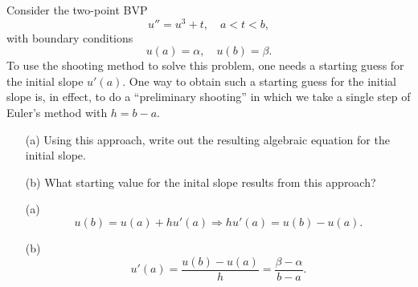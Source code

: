 \begin{pro}
  Consider the two-point BVP
  \begin{displaymath}
    u'' = u^3 + t, \quad a < t < b,
  \end{displaymath}
  with boundary conditions
  \begin{displaymath}
    u(a) = \alpha, \quad u(b) = \beta.
  \end{displaymath}
  To use the shooting method to solve this problem,
  one needs a starting guess for the initial slope $u'(a)$.
  One way to obtain such a starting guess for the initial slope is,
  in effect,
  to do a ``preliminary shooting'' in which we take a single step
  of Euler's method with $h=b-a$.
  \begin{itemize}
  \item[(a)]
    Using this approach,
    write out the resulting algebraic equation for the initial slope.

  \item[(b)]
    What starting value for the inital slope results from this approach?
  \end{itemize}
\end{pro}

\begin{sol}
  \begin{itemize}
  \item[(a)]
    \begin{displaymath}
      u(b) = u(a) + hu'(a) \Rightarrow hu'(a) = u(b)-u(a).
    \end{displaymath}

  \item[(b)]
    \begin{displaymath}
      u'(a) = \frac{u(b)-u(a)}{h} = \frac{\beta-\alpha}{b-a}.
    \end{displaymath}
  \end{itemize}
\end{sol}
